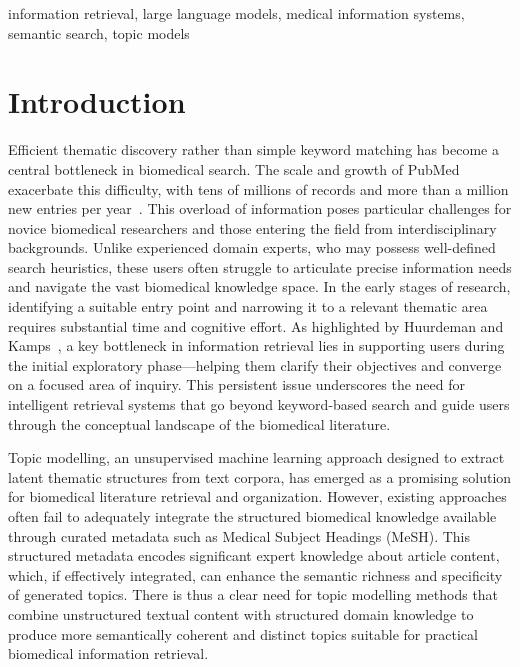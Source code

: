 \documentclass[authorproof,JACIII,researchpaper]{fujipressarticle}
\begin{document}
\begin{keywords}
information retrieval, large language models, medical information systems, semantic search, topic models
\end{keywords}


\section{Introduction}
\label{sec:introduction}
Efficient thematic discovery rather than simple keyword matching has become a central bottleneck in biomedical search. The scale and growth of PubMed exacerbate this difficulty, with tens of millions of records and more than a million new entries per year~\cite{jin_pubmed_2024}. This overload of information poses particular challenges for novice biomedical researchers and those entering the field from interdisciplinary backgrounds. Unlike experienced domain experts, who may possess well-defined search heuristics, these users often struggle to articulate precise information needs and navigate the vast biomedical knowledge space. In the early stages of research, identifying a suitable entry point and narrowing it to a relevant thematic area requires substantial time and cognitive effort. As highlighted by Huurdeman and Kamps~\cite{fu_designing_2020}, a key bottleneck in information retrieval lies in supporting users during the initial exploratory phase---helping them clarify their objectives and converge on a focused area of inquiry. This persistent issue underscores the need for intelligent retrieval systems that go beyond keyword-based search and guide users through the conceptual landscape of the biomedical literature.

Topic modelling, an unsupervised machine learning approach designed to extract latent thematic structures from text corpora, has emerged as a promising solution for biomedical literature retrieval and organization. However, existing approaches often fail to adequately integrate the structured biomedical knowledge available through curated metadata such as Medical Subject Headings (MeSH). This structured metadata encodes significant expert knowledge about article content, which, if effectively integrated, can enhance the semantic richness and specificity of generated topics. There is thus a clear need for topic modelling methods that combine unstructured textual content with structured domain knowledge to produce more semantically coherent and distinct topics suitable for practical biomedical information retrieval.
\end{document}
